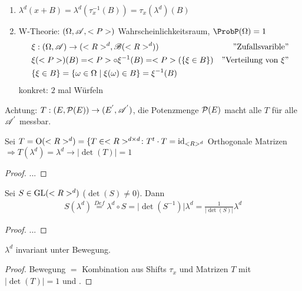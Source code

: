 \begin{example}
	\begin{enumerate}[label=(\alph*)]
		\item $\lambda^d(x+B) = \lambda^d(\tau_x^{-1}(B)) = \tau_x(\lambda^d)(B)$
		\item W-Theorie: $(\Omega, \mathscr{A}, <P>)$ Wahrscheinlichkeitsraum, $\ProbP(\Omega) = 1$
		\begin{align}
			&\xi: (\Omega, \mathscr{A}) \to (<R>^d, \mathscr{B} (<R>^d)) &\text{''Zufallsvarible''} \notag \\
			&\xi(<P>)(B) = <P> \circ \xi^{-1}(B) = <P>(\{ \xi \in B\}) &\text{''Verteilung von $\xi$''}\notag \\
			&\{\xi \in B\} = \{ \omega \in \Omega \mid \xi(\omega) \in B \} = \xi^{-1}(B) &
		\end{align}
		konkret: $2$ mal Würfeln %
	\end{enumerate}
\end{example}

Achtung: $T: (E, \mathcal{P}(E)) \to (E^{'}, \mathscr{A}^{'})$, die Potenzmenge $\mathcal{P}(E)$ macht alle $T$ für alle $\mathscr{A}^{'}$ messbar.

\begin{proposition}
	Sei $T = \operatorname{O}(<R>^d) = \{T \in <R>^{d\times d}\colon T^t \cdot T = \operatorname{id}_{<R>^d}$ Orthogonale Matrizen\\
	$\Rightarrow T(\lambda^d) = \lambda^d \to \vert \det (T)\vert = 1$
\end{proposition}

\begin{proof}
	...
\end{proof}

\begin{proposition}
	Sei $S \in \operatorname{GL}(<R>^d)$ ($\det(S) \neq 0$). Dann
	\begin{align}
		S(\lambda^d) \overset{Def}{=} \lambda^d \circ S = \vert \det(S^{-1})\vert \lambda^d = \frac{1}{\vert \det(S)\vert}\lambda^d
	\end{align}
\end{proposition}

\begin{proof}
	...
\end{proof}

\begin{conclusion}
	$\lambda^d$ invariant unter Bewegung.
\end{conclusion}

\begin{proof}
	Bewegung $=$ Kombination aus Shifts $\tau_x$ und Matrizen $T$ mit $\vert \det(T)\vert = 1$ und .
\end{proof}